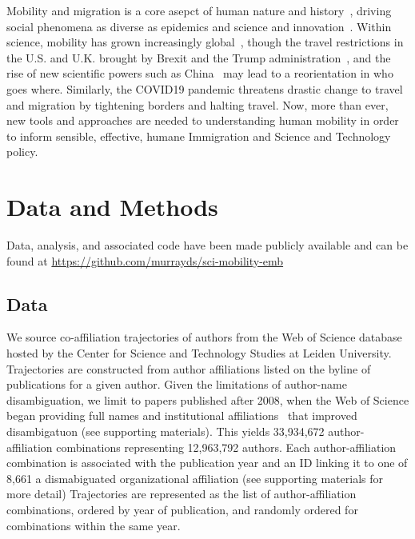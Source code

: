 \documentclass[12pt]{article} %
\begin{document}
Mobility and migration is a core asepct of human nature and history~\autocite{shah2020migration}, driving social phenomena as diverse as epidemics\autocite{kraemer2020covid, truscott2012epidemicgravity, xia2005measlesgravity} and science and innovation~\autocite{kaiser2018innovation, armano2017innovation, sugimoto2017mostimpact, petersen2018multiscale, franzoni2014advantage, morgan2018prestige, rodrigues2016mobility}. 
Within science, mobility has grown increasingly global~\autocite{czaika2018globalisation}, though the travel restrictions in the U.S. and U.K. brought by Brexit and the Trump administration~\autocite{chinchilla2018travelban}, and the rise of new scientific powers such as China~\autocite{tollefson2018china, cao2020returning} may lead to a reorientation in who goes where.  
Similarly, the COVID19 pandemic threatens drastic change to travel and migration by tightening borders and halting travel. 
Now, more than ever, new tools and approaches are needed to understanding human mobility in order to inform sensible, effective, humane Immigration and Science and Technology policy.



%
%
\section*{Data and Methods}
\label{sec:datamethods} %

Data, analysis, and associated code have been made publicly available and can be found at \url{https://github.com/murrayds/sci-mobility-emb}

\subsection*{Data}
We source co-affiliation trajectories of authors from the Web of Science database hosted by the Center for Science and Technology Studies at Leiden University.
Trajectories are constructed from author affiliations listed on the byline of publications for a given author.
Given the limitations of author-name disambiguation, we limit to papers published after 2008, when the Web of Science began providing full names and institutional affiliations~\autocite{caron2014disambiguation} that improved disambigatuon (see supporting materials).
This yields 33,934,672 author-affiliation combinations representing 12,963,792 authors.
Each author-affiliation combination is associated with the publication year and an ID linking it to one of 8,661 a dismabiguated organizational affiliation (see supporting materials for more detail)
Trajectories are represented as the list of author-affiliation combinations, ordered by year of publication, and randomly ordered for combinations within the same year.
\end{document}
